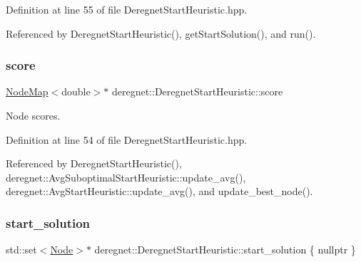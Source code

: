 Definition at line 55 of file Deregnet\+Start\+Heuristic.\+hpp.



Referenced by Deregnet\+Start\+Heuristic(), get\+Start\+Solution(), and run().

\mbox{\label{classderegnet_1_1DeregnetStartHeuristic_ae03300e79482975e98f95cba19ad32b0}} 
\subsubsection{\texorpdfstring{score}{score}}
{\footnotesize\ttfamily \hyperlink{namespacederegnet_ae102b707ae1d6f83c639ece5e0dd5658}{Node\+Map}$<$double$>$$\ast$ deregnet\+::\+Deregnet\+Start\+Heuristic\+::score\hspace{0.3cm}{\ttfamily [protected]}}



Node scores. 



Definition at line 54 of file Deregnet\+Start\+Heuristic.\+hpp.



Referenced by Deregnet\+Start\+Heuristic(), deregnet\+::\+Avg\+Suboptimal\+Start\+Heuristic\+::update\+\_\+avg(), deregnet\+::\+Avg\+Start\+Heuristic\+::update\+\_\+avg(), and update\+\_\+best\+\_\+node().

\mbox{\label{classderegnet_1_1DeregnetStartHeuristic_a7450e11ca0a265b055f95e7832b65e2f}} 
\subsubsection{\texorpdfstring{start\+\_\+solution}{start\_solution}}
{\footnotesize\ttfamily std\+::set$<$\hyperlink{namespacederegnet_a744bad34f2de9856d36715a445f027f3}{Node}$>$$\ast$ deregnet\+::\+Deregnet\+Start\+Heuristic\+::start\+\_\+solution \{ nullptr \}\hspace{0.3cm}{\ttfamily [protected]}}



